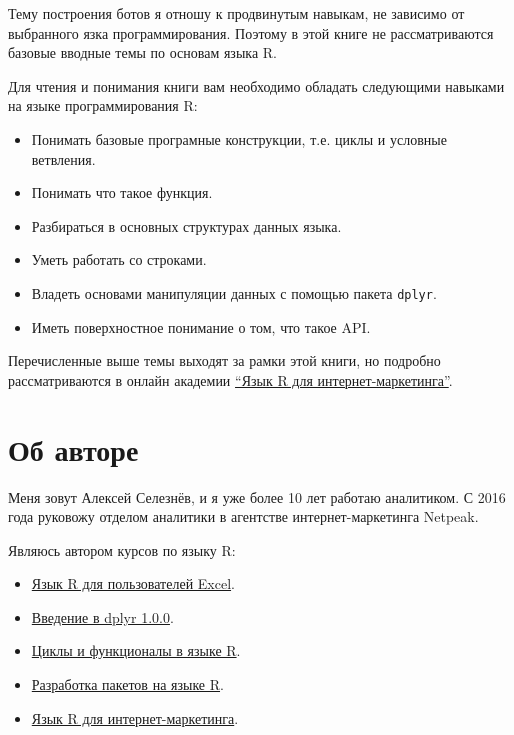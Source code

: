 \documentclass[
]{book}
\providecommand{\tightlist}{%
  \setlength{\itemsep}{0pt}\setlength{\parskip}{0pt}}
\begin{document}
Тему построения ботов я отношу к продвинутым навыкам, не зависимо от выбранного язка программирования. Поэтому в этой книге не рассматриваются базовые вводные темы по основам языка R.

Для чтения и понимания книги вам необходимо обладать следующими навыками на языке программирования R:

\begin{itemize}
\tightlist
\item
  Понимать базовые програмные конструкции, т.е. циклы и условные ветвления.
\item
  Понимать что такое функция.
\item
  Разбираться в основных структурах данных языка.
\item
  Уметь работать со строками.
\item
  Владеть основами манипуляции данных с помощью пакета \texttt{dplyr}.
\item
  Иметь поверхностное понимание о том, что такое API.
\end{itemize}

Перечисленные выше темы выходят за рамки этой книги, но подробно рассматриваются в онлайн академии \href{https://r-for-marketing.netpeak.net/}{``Язык R для интернет-маркетинга''}.

\section*{Об авторе}\label{ux43eux431-ux430ux432ux442ux43eux440ux435}

Меня зовут Алексей Селезнёв, и я уже более 10 лет работаю аналитиком. С 2016 года руковожу отделом аналитики в агентстве интернет-маркетинга Netpeak.

Являюсь автором курсов по языку R:

\begin{itemize}
\tightlist
\item
  \href{https://selesnow.github.io/r4excel_users/}{Язык R для пользователей Excel}.
\item
  \href{https://selesnow.github.io/dplyr_1_0_0_course/}{Введение в dplyr 1.0.0}.
\item
  \href{https://selesnow.github.io/iterations_in_r/}{Циклы и функционалы в языке R}.
\item
  \href{https://selesnow.github.io/r_package_course/}{Разработка пакетов на языке R}.
\item
  \href{https://www.youtube.com/playlist?list=PLD2LDq8edf4o6dSZ4BIr7J08gT97nimH_}{Язык R для интернет-маркетинга}.
\end{itemize}
\end{document}

